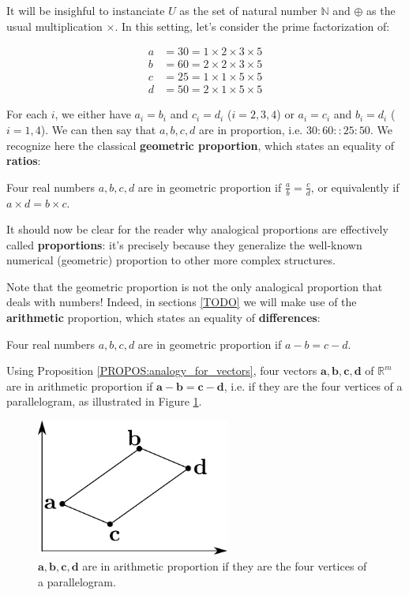 It will be insighful to instanciate $U$ as the set of natural number
$\mathbb{N}$ and $\oplus$ as the usual multiplication $\times$. In this setting, let's
consider the prime factorization of:

\begin{align*}
  a &= 30 = 1 \times 2 \times 3 \times 5\\
  b &= 60 = 2 \times 2 \times 3 \times 5\\
  c &= 25 = 1 \times 1 \times 5 \times 5\\
  d &= 50 = 2 \times 1 \times 5 \times 5
\end{align*}

For each $i$, we either have $a_i = b_i$ and $c_i = d_i$ ($i = 2, 3, 4$) or
$a_i = c_i$ and $b_i = d_i$ ($i = 1, 4$). We can then say that $a, b, c, d$ are
in proportion, i.e. $30: 60 :: 25:50$. We recognize here the classical
\textbf{geometric proportion}, which states an equality of \textbf{ratios}:
\begin{definition}
\label{DEF:geometric_proportion}
Four real numbers $a, b, c, d$ are in geometric proportion if
$\frac{a}{b} = \frac{c}{d}$, or equivalently if $a\times d = b \times c$.
\end{definition}

It should now be clear for the reader why analogical proportions are
effectively called \textbf{proportions}: it's precisely because they generalize
the well-known numerical (geometric) proportion to other more complex
structures.

Note that the geometric proportion is not the only analogical proportion that
deals with numbers! Indeed, in sections \ref{TODO} we will make use of
the \textbf{arithmetic} proportion, which states an equality of
\textbf{differences}:
\begin{definition}
\label{DEF:arithmetic_proportion}
Four real numbers $a, b, c, d$ are in geometric proportion if $a - b = c - d$.
\end{definition}

Using Proposition \ref{PROPOS:analogy_for_vectors}, four vectors $\mathbf{a},
\mathbf{b}, \mathbf{c}, \mathbf{d}$ of $\mathbb{R}^m$ are in arithmetic
proportion if $\mathbf{a} - \mathbf{b} = \mathbf{c} - \mathbf{d}$, i.e. if they
are the four vertices of a parallelogram, as illustrated in Figure
\ref{FIG:arithmetic_proportion}.

\begin{figure}[!h]
\centering
  \includegraphics[width=2.5in]{figures/arithmetic_proportion.pdf}
  \caption{$\mathbf{a}, \mathbf{b}, \mathbf{c}, \mathbf{d}$
  are in arithmetic proportion if they are the four vertices of a
  parallelogram.}
\label{FIG:arithmetic_proportion}
\end{figure}

